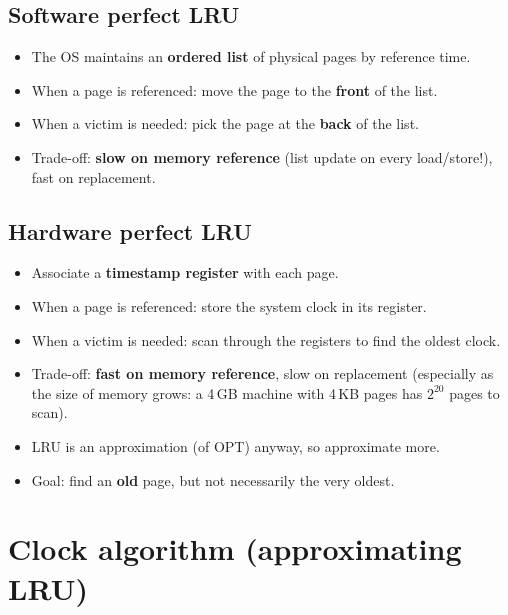 \documentclass[11pt,a4paper]{article}
\begin{document}
\subsection{Software perfect LRU}
\begin{itemize}
  \item The OS maintains an \textbf{ordered list} of physical pages by
        reference time.
  \item When a page is referenced: move the page to the \textbf{front} of
        the list.
  \item When a victim is needed: pick the page at the \textbf{back} of the
        list.
  \item Trade-off: \textbf{slow on memory reference} (list update on every
        load/store!), fast on replacement.
\end{itemize}

\subsection{Hardware perfect LRU}
\begin{itemize}
  \item Associate a \textbf{timestamp register} with each page.
  \item When a page is referenced: store the system clock in its register.
  \item When a victim is needed: scan through the registers to find the
        oldest clock.
  \item Trade-off: \textbf{fast on memory reference}, slow on replacement
        (especially as the size of memory grows: a 4\,GB machine with 4\,KB
        pages has \(2^{20}\) pages to scan).
\end{itemize}

\begin{keybox}
\begin{itemize}
  \item LRU is an approximation (of OPT) anyway, so approximate more.
  \item Goal: find an \textbf{old} page, but not necessarily the very
        oldest.
\end{itemize}
\end{keybox}

\section{Clock algorithm (approximating LRU)}
\end{document}
